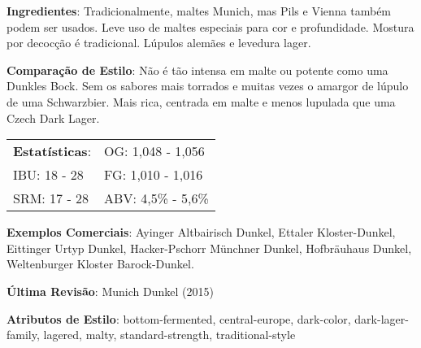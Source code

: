 \textbf{Ingredientes}: Tradicionalmente, maltes Munich, mas Pils e Vienna também podem ser usados. Leve uso de maltes especiais para cor e profundidade. Mostura por decocção é tradicional. Lúpulos alemães e levedura lager.

\textbf{Comparação de Estilo}: Não é tão intensa em malte ou potente como uma Dunkles Bock. Sem os sabores mais torrados e muitas vezes o amargor de lúpulo de uma Schwarzbier. Mais rica, centrada em malte e menos lupulada que uma Czech Dark Lager.

\begin{tabular}{@{}p{35mm}p{35mm}@{}}
  \textbf{Estatísticas}: & OG: 1,048 - 1,056 \\
  IBU: 18 - 28 & FG: 1,010 - 1,016 \\
  SRM: 17 - 28 & ABV: 4,5\% - 5,6\%
\end{tabular}

\textbf{Exemplos Comerciais}: Ayinger Altbairisch Dunkel, Ettaler Kloster-Dunkel, Eittinger Urtyp Dunkel, Hacker-Pschorr Münchner Dunkel, Hofbräuhaus Dunkel, Weltenburger Kloster Barock-Dunkel.

\textbf{Última Revisão}: Munich Dunkel (2015)

\textbf{Atributos de Estilo}: bottom-fermented, central-europe, dark-color, dark-lager-family, lagered, malty, standard-strength, traditional-style
